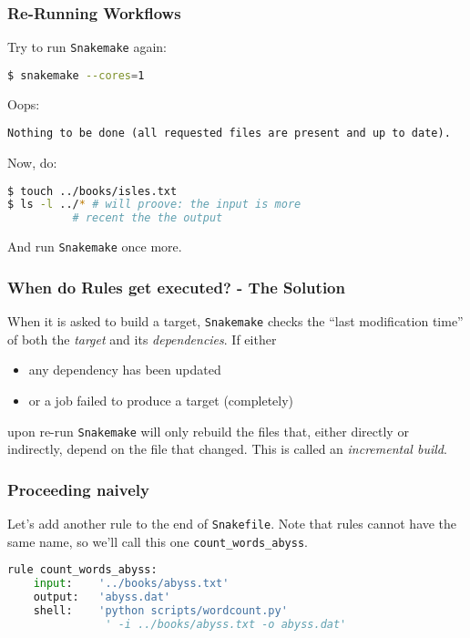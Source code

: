 \begin{frame}[fragile]
  \frametitle{Re-Running Workflows}
  Try to run \texttt{Snakemake} again:
  \begin{lstlisting}[language=Bash, style=Shell]
$ snakemake --cores=1
  \end{lstlisting}
  \pause
  Oops:
  \begin{lstlisting}[style=Plain, basicstyle=\footnotesize]
Nothing to be done (all requested files are present and up to date).
  \end{lstlisting}
  \pause
  Now, do:
  \begin{lstlisting}[language=Bash, style=Shell]
$ touch ../books/isles.txt
$ ls -l ../* # will proove: the input is more 
          # recent the the output
  \end{lstlisting}
  And run \texttt{Snakemake} once more.
\end{frame}

\begin{frame}
  \frametitle{When do Rules get executed? - The Solution}
  When it is asked to build a target, \texttt{Snakemake} checks the “last modification time” of both the \emph{target} and its \emph{dependencies}.
  If either
  \begin{itemize}
   \item any dependency has been updated
   \item or a job failed to produce a target (completely)
  \end{itemize}
  upon re-run \texttt{Snakemake} will only rebuild the files that, either directly or indirectly, depend on the file that changed. This is called an \emph{incremental build}.
  \pause
\end{frame}

\begin{frame}[fragile]
  \frametitle{Proceeding naively}
  Let’s add another rule to the end of \texttt{Snakefile}. Note that rules cannot have the same name, so we’ll call this one \texttt{count\_words\_abyss}.
  \begin{lstlisting}[language=Python,style=Python]
rule count_words_abyss:
    input:    '../books/abyss.txt'
    output:   'abyss.dat'
    shell:    'python scripts/wordcount.py' 
               ' -i ../books/abyss.txt -o abyss.dat'
  \end{lstlisting}
\end{frame}

